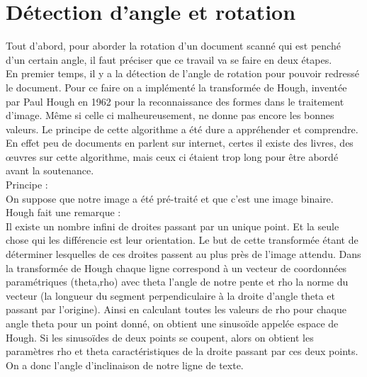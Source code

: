 \documentclass [french,12pt]{article}
\begin{document}
\section{Détection d'angle et rotation}

Tout d'abord, pour aborder la rotation d'un document scanné qui est penché d'un certain angle, il faut préciser que ce travail va se faire en deux étapes. 
\\En premier temps, il y a la détection de l'angle de rotation pour pouvoir redressé le document. Pour ce faire on a implémenté la transformée de Hough, inventée par Paul Hough en 1962 pour la reconnaissance des formes dans le traitement d'image. Même si celle ci malheureusement, ne donne pas encore les bonnes valeurs.
Le principe de cette algorithme a été dure a appréhender et comprendre. En effet peu de documents en parlent sur internet, certes il existe des livres, des œuvres sur cette algorithme, mais ceux ci étaient trop long pour être abordé avant la soutenance.
\\
Principe :\\
	On suppose que notre image a été pré-traité et que c’est une image binaire.
\\
Hough fait une remarque :
\\
Il existe un nombre infini de droites passant par un unique point. Et la seule chose qui les différencie est leur orientation.
Le but de cette transformée étant de déterminer lesquelles de ces droites passent au plus près de l’image attendu. Dans la transformée de Hough chaque ligne correspond à un vecteur de coordonnées paramétriques (theta,rho) avec theta l’angle de notre pente et rho la norme du vecteur (la longueur du segment perpendiculaire à la droite d'angle theta et passant par l'origine). Ainsi en calculant toutes les valeurs de rho pour chaque angle theta pour un point donné, on obtient une sinusoïde appelée espace de Hough. Si les sinusoïdes de deux points se coupent, alors on obtient les paramètres rho et theta caractéristiques de la droite passant par ces deux points. On a donc l’angle d’inclinaison de notre ligne de texte.
\end{document}
